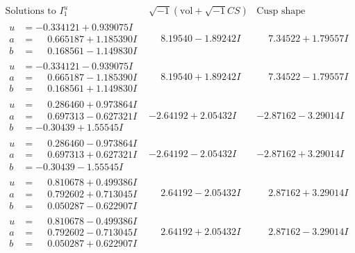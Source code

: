 \documentclass[1p]{elsarticle_modified}
\theoremstyle{definition}
\newcommand{\I}{\sqrt{-1}}
\begin{document}
$$\begin{array}{c|c|c}  
\text{Solutions to }I^u_{1}& \I (\text{vol} + \sqrt{-1}CS) & \text{Cusp shape}\\
 \hline 
\begin{aligned}
u &= -0.334121 + 0.939075 I \\
a &= \phantom{-}0.665187 + 1.185390 I \\
b &= \phantom{-}0.168561 - 1.149830 I\end{aligned}
 & \phantom{-}8.19540 - 1.89242 I & \phantom{-}7.34522 + 1.79557 I \\ \hline\begin{aligned}
u &= -0.334121 - 0.939075 I \\
a &= \phantom{-}0.665187 - 1.185390 I \\
b &= \phantom{-}0.168561 + 1.149830 I\end{aligned}
 & \phantom{-}8.19540 + 1.89242 I & \phantom{-}7.34522 - 1.79557 I \\ \hline\begin{aligned}
u &= \phantom{-}0.286460 + 0.973864 I \\
a &= \phantom{-}0.697313 - 0.627321 I \\
b &= -0.30439 + 1.55545 I\end{aligned}
 & -2.64192 + 2.05432 I & -2.87162 - 3.29014 I \\ \hline\begin{aligned}
u &= \phantom{-}0.286460 - 0.973864 I \\
a &= \phantom{-}0.697313 + 0.627321 I \\
b &= -0.30439 - 1.55545 I\end{aligned}
 & -2.64192 - 2.05432 I & -2.87162 + 3.29014 I \\ \hline\begin{aligned}
u &= \phantom{-}0.810678 + 0.499386 I \\
a &= \phantom{-}0.792602 + 0.713045 I \\
b &= \phantom{-}0.050287 - 0.622907 I\end{aligned}
 & \phantom{-}2.64192 - 2.05432 I & \phantom{-}2.87162 + 3.29014 I \\ \hline\begin{aligned}
u &= \phantom{-}0.810678 - 0.499386 I \\
a &= \phantom{-}0.792602 - 0.713045 I \\
b &= \phantom{-}0.050287 + 0.622907 I\end{aligned}
 & \phantom{-}2.64192 + 2.05432 I & \phantom{-}2.87162 - 3.29014 I \\ \hline\begin{aligned}

\end{aligned}
\end{array}$$
\end{document}
